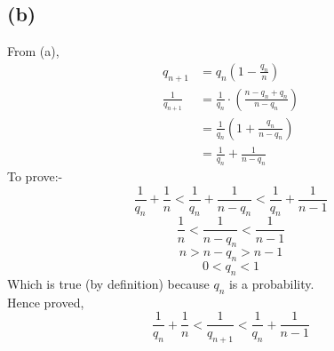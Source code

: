 \documentclass{article}
\begin{document}
\subsection*{(b)}
From (a),
\begin{align*}
    q_{n+1}&=q_n\left(1-\frac{q_n}{n}\right) \\
    \frac{1}{q_{n+1}}&=\frac{1}{q_n} \cdot \left(\frac{n-q_{n}+q_{n}}{n-q_{n}}\right) \\
                     &=\frac{1}{q_n}\left(1+\frac{q_n}{n-q_n}\right) \\
                     &=\frac{1}{q_n} + \frac{1}{n-q_n}
\end{align*}
To prove:-
\[\frac{1}{q_n} + \frac{1}{n}< \frac{1}{q_n} + \frac{1}{n-q_n} < \frac{1}{q_n} + \frac{1}{n-1}\]
\[\frac{1}{n} < \frac{1}{n-q_n} < \frac{1}{n-1}\]
\[n > n-q_n > n-1\]
\[0<q_n<1\]
Which is true (by definition) because $q_n$ is a probability. \\
Hence proved,
\[\boxed{\frac{1}{q_n} + \frac{1}{n} < \frac{1}{q_{n+1}} < \frac{1}{q_n} + \frac{1}{n-1}}\]
\end{document}
